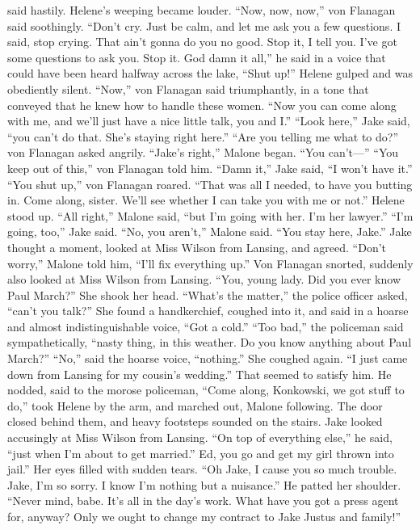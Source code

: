 \documentclass{novel}
\begin{document}
said hastily. Helene’s weeping became louder. “Now, now, now,” von Flanagan said soothingly. “Don’t cry. Just be calm, and let me ask you a few questions. I said, stop crying. That ain’t gonna do you no good. Stop it, I tell you. I’ve got some questions to ask you. Stop it. God damn it all,” he said in a voice that could have been heard halfway across the lake, “Shut up!” Helene gulped and was obediently silent. “Now,” von Flanagan said triumphantly, in a tone that conveyed that he knew how to handle these women. “Now you can come along with me, and we’ll just have a nice little talk, you and I.” “Look here,” Jake said, “you can’t do that. She’s staying right here.” “Are you telling me what to do?” von Flanagan asked angrily. “Jake’s right,” Malone began. “You can’t—” “You keep out of this,” von Flanagan told him. “Damn it,” Jake said, “I won’t have it.” “You shut up,” von Flanagan roared. “That was all I needed, to have you butting in. Come along, sister. We’ll see whether I can take you with me or not.” Helene stood up. “All right,” Malone said, “but I’m going with her. I’m her lawyer.” “I’m going, too,” Jake said. “No, you aren’t,” Malone said. “You stay here, Jake.” Jake thought a moment, looked at Miss Wilson from Lansing, and agreed. “Don’t worry,” Malone told him, “I’ll fix everything up.” Von Flanagan snorted, suddenly also looked at Miss Wilson from Lansing. “You, young lady. Did you ever know Paul March?” She shook her head. “What’s the matter,” the police officer asked, “can’t you talk?” She found a handkerchief, coughed into it, and said in a hoarse and almost indistinguishable voice, “Got a cold.” “Too bad,” the policeman said sympathetically, “nasty thing, in this weather. Do you know anything about Paul March?” “No,” said the hoarse voice, “nothing.” She coughed again. “I just came down from Lansing for my cousin’s wedding.” That seemed to satisfy him. He nodded, said to the morose policeman, “Come along, Konkowski, we got stuff to do,” took Helene by the arm, and marched out, Malone following. The door closed behind them, and heavy footsteps sounded on the stairs. Jake looked accusingly at Miss Wilson from Lansing. “On top of everything else,” he said, “just when I’m about to get married.” Ed, you go and get my girl thrown into jail.” Her eyes filled with sudden tears. “Oh Jake, I cause you so much trouble. Jake, I’m so sorry. I know I'm nothing but a nuisance.” He patted her shoulder. “Never mind, babe. It’s all in the day’s work. What have you got a press agent for, anyway? Only we ought to change my contract to Jake Justus and family!”
\end{document}
